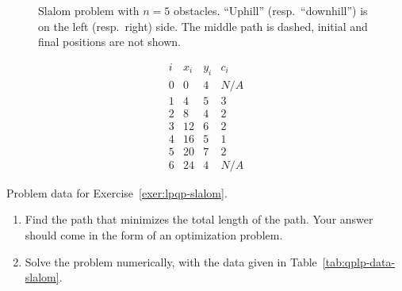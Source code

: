 \documentclass[11pt]{article}
\begin{document}
\begin{figure}[h]
\begin{center}
\end{center}
\caption{\label{fig:slalom_pic.pdf}  Slalom problem with $n=5$ obstacles. ``Uphill'' (resp.\ ``downhill'') is on the left (resp.\ right) side. The middle path is dashed, initial and final positions are not shown.}
\end{figure}

\begin{table}[h]
\begin{center}
\[
\begin{array}{c|ccc}
i & x_i & y_i & c_i \\\hline
0 & 0 & 4 & N/A \\
1 & 4 & 5 & 3 \\
2 & 8 & 4 & 2 \\
3 & 12 & 6 & 2 \\
4 & 16 & 5 & 1 \\
5 & 20 & 7 & 2 \\
6 & 24 & 4 & N/A
\end{array}
\]
\end{center}
\caption{Problem data for Exercise~\ref{exer:lpqp-slalom}.}
\label{tab:qplp-data-slalom}
\end{table}
\begin{enumerate}
\item Find the path that minimizes the total length of the path. Your answer should come in the form of an optimization problem.

\item Solve the problem numerically, with the data given in Table~\ref{tab:qplp-data-slalom}.
\end{enumerate}


\begin{solution}
\end{solution}
\end{document}
